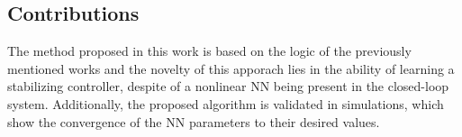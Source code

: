 

\subsection{Contributions}
\label{sec:contributions}
The method proposed in this work is based on the logic of the previously mentioned works and the novelty of this apporach lies in the ability of learning a stabilizing controller, despite of a nonlinear NN being present in the closed-loop system. Additionally, the proposed algorithm is validated in simulations, which show the convergence of the NN parameters to their desired values.